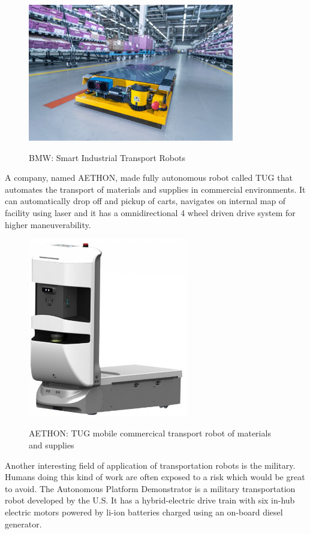 \documentclass[12pt,english,twoside]{article}
\begin{document}
\begin{figure}[htb!]
	\centering
	\includegraphics[width=9cm]{figures/bmw.jpg}
	\label{bmw}
	\caption{BMW: Smart Industrial Transport Robots  \cite{bmw}}
\end{figure}

A company, named AETHON, made fully autonomous robot called TUG that automates the transport of materials and supplies in commercial environments. It can automatically drop off and pickup of carts, navigates on internal map of facility using laser and it has a omnidirectional 4 wheel driven drive system for higher maneuverability.

\begin{figure}[htb!]
	\centering
	\includegraphics[width=7cm]{figures/tug.png}
	\label{bmw}
	\caption{AETHON: TUG mobile commercical transport robot of materials and supplies}
\end{figure}

Another interesting field of application of transportation robots is the military. Humans doing this kind of work are often exposed to a risk which would be great to avoid. The Autonomous Platform Demonstrator is a military transportation robot developed by the U.S. It has a hybrid-electric drive train with six in-hub electric motors powered by li-ion batteries charged using an on-board diesel generator. 
\end{document}
